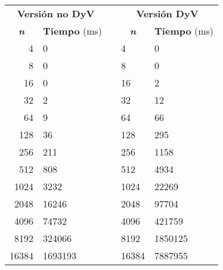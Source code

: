 \documentclass[10pt, a4paper]{article}
\theoremstyle{theorem-style}
\theoremstyle{theorem-style}
\theoremstyle{definition-style}
\theoremstyle{remark-style}
\theoremstyle{example-style}
\theoremstyle{definition-style}
\theoremstyle{remark-style}
\begin{document}
\begin{table}[h]
\centering
\begin{tabular}{|r|l|l|l|l|}
\cline{1-2} \cline{4-5}
\multicolumn{2}{c}{\cellcolor[HTML]{4DB6AC}\textbf{Versión no DyV}} & & \multicolumn{2}{c}{\cellcolor[HTML]{4DB6AC}\textbf{Versión DyV}} \\
\cline{1-2} \cline{4-5}
\multicolumn{1}{c}{\cellcolor[HTML]{80CBC4}\textbf{\emph{n}}} & \multicolumn{1}{c}{\cellcolor[HTML]{80CBC4}\textbf{Tiempo} (ms)} & & \multicolumn{1}{c}{\cellcolor[HTML]{80CBC4}\textbf{\emph{n}}} & \multicolumn{1}{c}{\cellcolor[HTML]{80CBC4}\textbf{Tiempo} (ms)}\\
\cline{1-2} \cline{4-5}
4 & 0 & & 4 & 0 \\
  8 & 0 & & 8 & 0  \\
 16 & 0 & & 16 & 2  \\
32 &  2 & & 32 &  12\\
 64 & 9 & & 64 & 66  \\
 128 & 36 & & 128 & 295  \\
 256 & 211 & & 256 & 1158  \\
512 &  808 & & 512 & 4934  \\
 1024 & 3232 & & 1024 & 22269  \\
 2048 & 16246 & & 2048 & 97704  \\
 4096 & 74732 & & 4096 & 421759 \\
8192 &  324066 & & 8192 & 1850125  \\
16384 & 1693193 & & 16384 & 7887955 \\
 \cline{1-2} \cline{4-5}

\end{tabular}
\end{table}
\vspace{0.5cm}
\begin{center}
\end{center}
\end{document}
